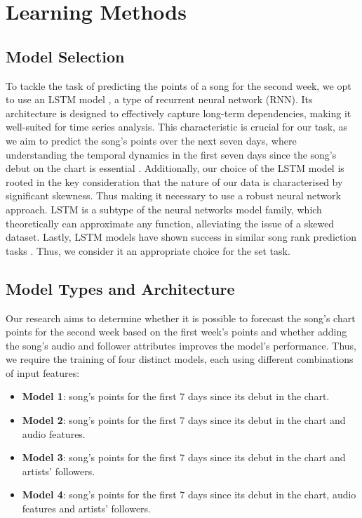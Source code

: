 \documentclass{article}
\begin{document}
\section{Learning Methods}
\subsection{Model Selection}
To tackle the task of predicting the points of a song for the second week, we opt to use an LSTM model \cite{original_LSTM}, a type of recurrent neural network (RNN). Its architecture is designed to effectively capture long-term dependencies, making it well-suited for time series analysis. This characteristic is crucial for our task, as we aim to predict the song's points over the next seven days, where understanding the temporal dynamics in the first seven days since the song's debut on the chart is essential \cite{LSTM_paper}. Additionally, our choice of the LSTM model is rooted in the key consideration that the nature of our data is characterised by significant skewness. Thus making it necessary to use a robust neural network approach. LSTM is a subtype of the neural networks model family, which theoretically can approximate any function\cite{NNcancomputeanyfunction}, alleviating the issue of a skewed dataset.
Lastly, LSTM models have shown success in similar song rank prediction tasks \cite{LSTM_Wang}\cite{LSTM_Random_Forest}. Thus, we consider it an appropriate choice for the set task.

\subsection{Model Types and Architecture}
Our research aims to determine whether it is possible to forecast the song's chart points for the second week based on the first week's points and whether adding the song's audio and follower attributes improves the model's performance. Thus, we require the training of four distinct models, each using different combinations of input features:

\begin{itemize}[leftmargin=10pt]
  \item[] \textbf{Model 1}: song's points for the first 7 days since its debut in the chart. 
  \item[] \textbf{Model 2}: song's points for the first 7 days since its debut in the chart and audio features.
  \item[] \textbf{Model 3}: song's points for the first 7 days since its debut in the chart and artists' followers.
  \item[] \textbf{Model 4}: song's points for the first 7 days since its debut in the chart, audio features and artists' followers.
\end{itemize}
\end{document}

